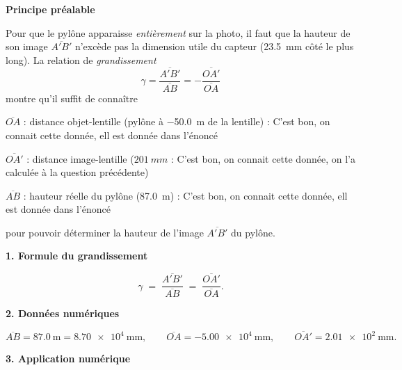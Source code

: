 \documentclass[answers]{exam}
\newcommand{\cmark}{\ding{51}}
\begin{document}
\begin{questions}
\begin{questions}
\begin{solution}
\textbf{Principe préalable}

Pour que le pylône apparaisse \emph{entièrement} sur la photo, il faut que la 
hauteur de son image \(\overline{A'B'}\) n’excède pas la dimension utile du 
capteur (\SI{23.5}{\milli\metre} côté le plus long).  
La relation de \emph{grandissement}  
\[
  \gamma = \frac{\overline{A'B'}}{\overline{AB}}
          = -\frac{\overline{OA'}}{\overline{OA}}
\]
montre qu’il suffit de connaître 

\begin{addmargin}[4em]{1em}
\begin{compactitem}
  \item[\(\overline{OA}\)]  : distance objet-lentille (pylône à \SI{-50.0}{m} de la lentille) : \cmark C'est bon, on connait cette donnée, ell est donnée dans l'énoncé
  \item[\(\overline{OA'}\)] : distance image-lentille (\(\SI{201}{mm}\) : \cmark C'est bon, on connait cette donnée, on l'a calculée à la question précédente)  
  \item[\(\overline{AB}\)]  : hauteur réelle du pylône (\SI{87.0}{m}) : \cmark C'est bon, on connait cette donnée, ell est donnée dans l'énoncé
\end{compactitem}
\end{addmargin}

pour pouvoir déterminer la hauteur de l’image \(\overline{A'B'}\) du pylône.

\bigskip
\textbf{1. Formule du grandissement}

\[
  \gamma \;=\; \frac{\overline{A'B'}}{\overline{AB}}
  \;=\; \frac{\overline{OA'}}{\overline{OA}}.
\]

\bigskip
\textbf{2. Données numériques}

\[
  \overline{AB} = \SI{87.0}{\meter} = \SI{8.70e4}{\milli\metre},\qquad
  \overline{OA} = -\SI{5.00e4}{\milli\metre},\qquad
  \overline{OA'} = \SI{2.01e2}{\milli\metre}.
\]

\bigskip
\textbf{3. Application numérique}


\end{solution}
\end{questions}
\end{questions}
\end{document}
